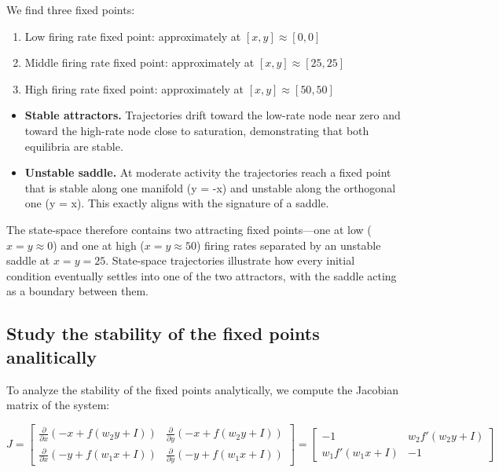 \documentclass{article}
\begin{document}
We find three fixed points:
\begin{enumerate}
    \item Low firing rate fixed point: approximately at $[x, y] \approx [0, 0]$
    \item Middle firing rate fixed point: approximately at $[x, y] \approx [25, 25]$
    \item High firing rate fixed point: approximately at $[x, y] \approx [50, 50]$
\end{enumerate}


\begin{itemize}
    \item \textbf{Stable attractors.}  Trajectories drift toward the low-rate node near zero and toward the high-rate node close to saturation, demonstrating that both equilibria are stable.
    \item \textbf{Unstable saddle.} At moderate activity the trajectories reach a fixed point that is stable along one manifold (y = -x) and unstable along the orthogonal one (y = x). This exactly aligns with the signature of a saddle.
  \end{itemize}
  
  \noindent
  The state-space therefore contains two attracting fixed points—one at low (\(x=y\approx0\))
  and one at high (\(x=y\approx50\)) firing rates separated by an unstable saddle at
  \(x=y=25\).  State-space trajectories illustrate how every initial
  condition eventually settles into one of the two attractors, with the
  saddle acting as a boundary between them.

\subsection{Study the stability of the fixed points analitically}
To analyze the stability of the fixed points analytically, we compute the Jacobian matrix of the system:

\begin{equation}
J = 
\begin{bmatrix}
\frac{\partial}{\partial x}\left(-x + f(w_2 y + I)\right) & \frac{\partial}{\partial y}\left(-x + f(w_2 y + I)\right) \\
\frac{\partial}{\partial x}\left(-y + f(w_1 x + I)\right) & \frac{\partial}{\partial y}\left(-y + f(w_1 x + I)\right)
\end{bmatrix}
=
\begin{bmatrix}
-1 & w_2 f'(w_2 y + I) \\
w_1 f'(w_1 x + I) & -1
\end{bmatrix}
\end{equation}
\end{document}
